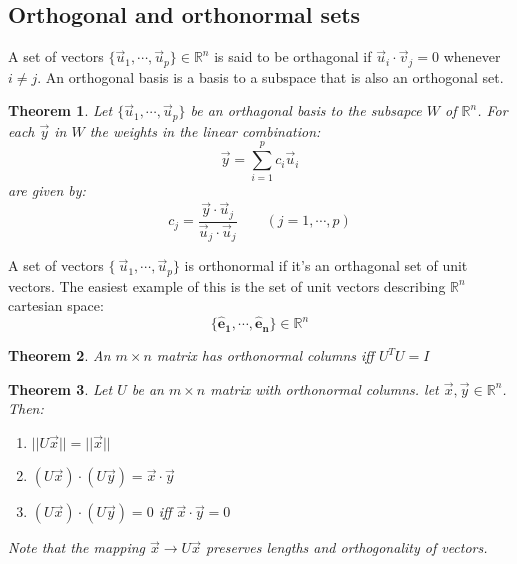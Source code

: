 \documentclass[11pt, a4paper]{article}
\newcommand*{\R}{\ensuremath{\mathbb{R}}}
\newtheorem{theorem}{Theorem}
\begin{document}
\subsection{Orthogonal and orthonormal sets}
A set of vectors $\{\vec{u}_1, \cdots, \vec{u}_p \} \in \R^n$ is said to be orthagonal if $\vec{u}_i \cdot \vec{v}_j = 0$ whenever $i \neq j$. An orthogonal basis is a basis to a subspace that is also an orthogonal set.

\begin{theorem}
  Let $\{\vec{u}_1, \cdots, \vec{u}_p \}$ be an orthagonal basis to the subsapce $W$ of $\R^n$. For each $\vec{y}$ in $W$ the weights in the linear combination:
  \begin{equation}
    \vec{y} = \sum_{i=1}^p c_i\vec{u}_i
  \end{equation}
  are given by:
  \begin{equation}
    c_j = \frac{\vec{y}\cdot \vec{u}_j}{\vec{u}_j \cdot \vec{u}_j} \qquad (j = 1, \cdots, p)
  \end{equation}
\end{theorem}

A set of vectors $\{\ \vec{u}_1, \cdots, \vec{u}_p \}$ is orthonormal if it's an orthagonal set of unit vectors. The easiest example of this is the set of unit vectors describing $\R^n$ cartesian space:
\begin{equation}
  \{ \boldsymbol{\hat{e}_1}, \cdots, \boldsymbol{\hat{e}_n}  \} \in \R^n
\end{equation}
\begin{theorem}
  An $m \times n$ matrix has orthonormal columns iff $U^TU = I$
\end{theorem}
\begin{theorem}
  Let $U$ be an $m \times n$ matrix with orthonormal columns. let $\vec{x}, \vec{y} \in \R^n$. Then:
  \begin{enumerate}
    \item $||U\vec{x}|| = ||\vec{x}||$
    \item $(U\vec{x})\cdot(U\vec{y}) = \vec{x}\cdot \vec{y}$
    \item $(U\vec{x})\cdot (U\vec{y}) = 0 $ iff $\vec{x} \cdot \vec{y} = 0$
  \end{enumerate}
  Note that the mapping $\vec{x} \to U\vec{x}$ preserves lengths and orthogonality of vectors.
\end{theorem}
\end{document}
